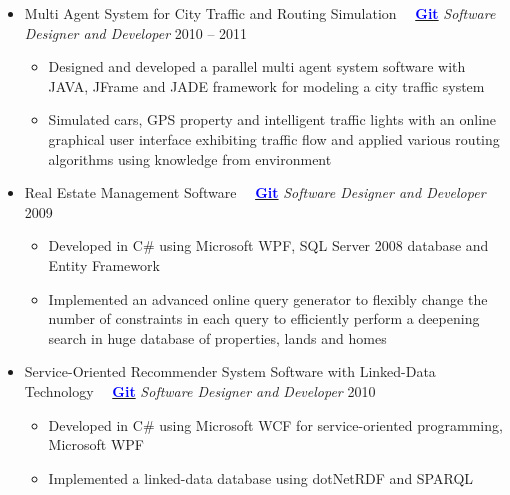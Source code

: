 \documentclass[letter]{res}
\begin{document}
\begin{resume}
\begin{itemize}[leftmargin=-.1in]
			\item Multi Agent System for City Traffic and Routing Simulation ~~{\href{https://github.com/omid55/city_routing_model_jade_mutli_agent_system}{\textbf{\textcolor{blue}{Git}}}} \newline
			{\sl Software Designer and Developer} \hfill 2010 – 2011\\
			\vspace{-4mm}
			\iflong
			\begin{itemize}
				\item Designed and developed a parallel multi agent system software with JAVA, JFrame and JADE framework for modeling a city traffic system
				\item Simulated cars, GPS property and intelligent traffic lights with an online graphical user interface exhibiting traffic flow and applied various routing algorithms using knowledge from environment
			\end{itemize}
			\fi
			
			\item Real Estate Management Software ~~{\href{https://github.com/omid55/real_state_manager}{\textbf{\textcolor{blue}{Git}}}}
			\newline
			{\sl Software Designer and Developer} \hfill 2009\\
			\vspace{-4mm}
			\iflong
			\begin{itemize}
				\item Developed in C\# using Microsoft WPF, SQL Server 2008 database and Entity Framework
				\item Implemented an advanced online query generator to flexibly change the number of constraints in each query to efficiently perform a deepening search in huge database of properties, lands and homes
			\end{itemize}
			\fi
			
			\item Service-Oriented Recommender System Software with Linked-Data Technology ~~{\href{https://github.com/omid55/service_oriented_linked_data_based_recommender_system}{\textbf{\textcolor{blue}{Git}}}}
			\newline
			{\sl Software Designer and Developer} \hfill 2010\\
			\vspace{-4mm}
			\iflong
			\begin{itemize}
				\item Developed in C\# using Microsoft WCF for service-oriented programming, Microsoft WPF
				\item Implemented a linked-data database using dotNetRDF and SPARQL
			\end{itemize}
			\fi
			

\end{itemize}
\end{resume}
\end{document}
